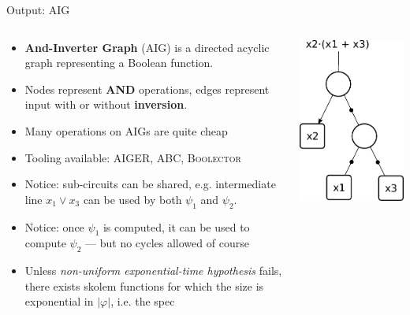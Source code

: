 \documentclass[aspectratio=169]{beamer}
\begin{document}
\begin{frame}{Output: AIG}
\begin{columns}
\begin{column}{0.68\textwidth}
\begin{itemize}
    \item \textbf{And-Inverter Graph} (AIG) is a directed acyclic graph
        representing a Boolean function.
    \item Nodes represent \textbf{AND} operations, edges represent
        input with or without \textbf{inversion}.
    \item Many operations on AIGs are quite cheap
    \item Tooling available: \textsc{AIGER, ABC, Boolector}
    \item Notice: sub-circuits can be shared, e.g. intermediate line $x_1 \lor
        x_3$ can be used by both $\psi_1$ and $\psi_2$.
    \item Notice: once $\psi_1$ is computed, it can be used to compute $\psi_2$
        --- but no cycles allowed of course
    \item Unless \emph{non-uniform exponential-time hypothesis} fails, there
        exists skolem functions for which the size is exponential in $|\varphi|$,
        i.e. the spec
\end{itemize}
\end{column}
\begin{column}{0.28\textwidth}
\begin{center}
\includegraphics[scale=0.6]{And-inverter-graph.pdf}
\end{center}
\end{column}
\end{columns}
\end{frame}
\end{document}

